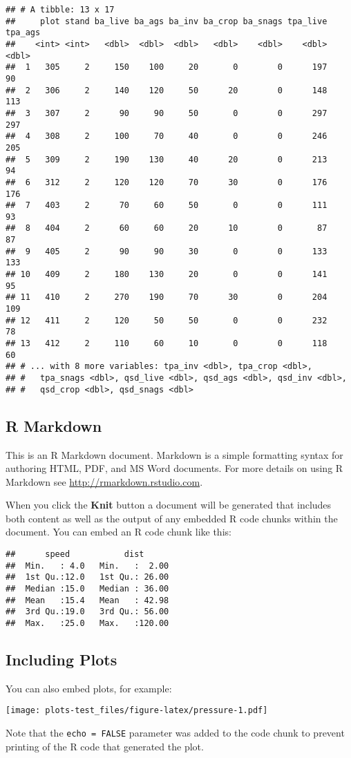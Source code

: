\documentclass[]{article}
\begin{document}
\begin{verbatim}
## # A tibble: 13 x 17
##     plot stand ba_live ba_ags ba_inv ba_crop ba_snags tpa_live tpa_ags
##    <int> <int>   <dbl>  <dbl>  <dbl>   <dbl>    <dbl>    <dbl>   <dbl>
##  1   305     2     150    100     20       0        0      197      90
##  2   306     2     140    120     50      20        0      148     113
##  3   307     2      90     90     50       0        0      297     297
##  4   308     2     100     70     40       0        0      246     205
##  5   309     2     190    130     40      20        0      213      94
##  6   312     2     120    120     70      30        0      176     176
##  7   403     2      70     60     50       0        0      111      93
##  8   404     2      60     60     20      10        0       87      87
##  9   405     2      90     90     30       0        0      133     133
## 10   409     2     180    130     20       0        0      141      95
## 11   410     2     270    190     70      30        0      204     109
## 12   411     2     120     50     50       0        0      232      78
## 13   412     2     110     60     10       0        0      118      60
## # ... with 8 more variables: tpa_inv <dbl>, tpa_crop <dbl>,
## #   tpa_snags <dbl>, qsd_live <dbl>, qsd_ags <dbl>, qsd_inv <dbl>,
## #   qsd_crop <dbl>, qsd_snags <dbl>
\end{verbatim}

\subsection{R Markdown}\label{r-markdown}

This is an R Markdown document. Markdown is a simple formatting syntax
for authoring HTML, PDF, and MS Word documents. For more details on
using R Markdown see \url{http://rmarkdown.rstudio.com}.

When you click the \textbf{Knit} button a document will be generated
that includes both content as well as the output of any embedded R code
chunks within the document. You can embed an R code chunk like this:

\begin{verbatim}
##      speed           dist       
##  Min.   : 4.0   Min.   :  2.00  
##  1st Qu.:12.0   1st Qu.: 26.00  
##  Median :15.0   Median : 36.00  
##  Mean   :15.4   Mean   : 42.98  
##  3rd Qu.:19.0   3rd Qu.: 56.00  
##  Max.   :25.0   Max.   :120.00
\end{verbatim}

\subsection{Including Plots}\label{including-plots}

You can also embed plots, for example:

\texttt{[image: plots-test\_files/figure-latex/pressure-1.pdf]}

Note that the \texttt{echo\ =\ FALSE} parameter was added to the code
chunk to prevent printing of the R code that generated the plot.
\end{document}
